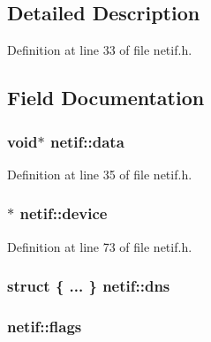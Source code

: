 \subsection{Detailed Description}


Definition at line 33 of file netif.\+h.



\subsection{Field Documentation}
\hypertarget{structnetif_af45fb467da3492eb4473cb9208044ac8}{
\subsubsection[{data}]{\setlength{\rightskip}{0pt plus 5cm}void$\ast$ netif\+::data}}\label{structnetif_af45fb467da3492eb4473cb9208044ac8}


Definition at line 35 of file netif.\+h.

\hypertarget{structnetif_a8d0c9464b5010487798a5ea8adce5a39}{
\subsubsection[{device}]{$\ast$ netif\+::device}}\label{structnetif_a8d0c9464b5010487798a5ea8adce5a39}


Definition at line 73 of file netif.\+h.

\hypertarget{structnetif_a30f1247e8e2ef8ac954833c81873608e}{
\subsubsection[{dns}]{\setlength{\rightskip}{0pt plus 5cm}struct \{ ... \}   netif\+::dns}}\label{structnetif_a30f1247e8e2ef8ac954833c81873608e}
\hypertarget{structnetif_a07586ae7a31c1231781af7394ce41659}{
\subsubsection[{flags}]{ netif\+::flags}}\label{structnetif_a07586ae7a31c1231781af7394ce41659}


